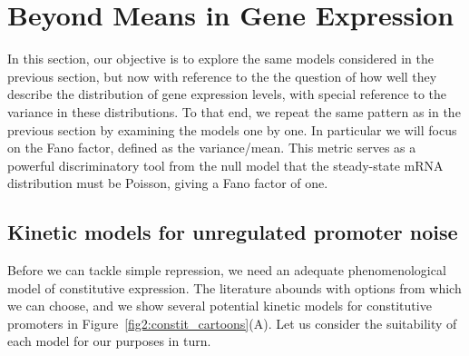 \section{Beyond Means in Gene Expression}
\label{sec:beyond_means}
 
In this section, our objective is to explore the same models considered in the
previous section, but now with reference to the the question of how well they
describe the distribution of gene expression levels, with special reference to
the variance in these distributions. To that end, we repeat the same pattern as
in the previous section by examining the models one by one. In particular
we will focus on the Fano factor, defined as the variance/mean. This metric
serves as a powerful discriminatory tool from the null model that the
steady-state mRNA distribution must be Poisson, giving a Fano factor of one.

\subsection{Kinetic models for unregulated promoter noise}

Before we can tackle simple repression, we need an adequate phenomenological
model of constitutive expression. The literature abounds with options from which
we can choose, and we show several potential kinetic models for constitutive
promoters in Figure~\ref{fig2:constit_cartoons}(A). Let us consider
the suitability of each model for our purposes in turn.

